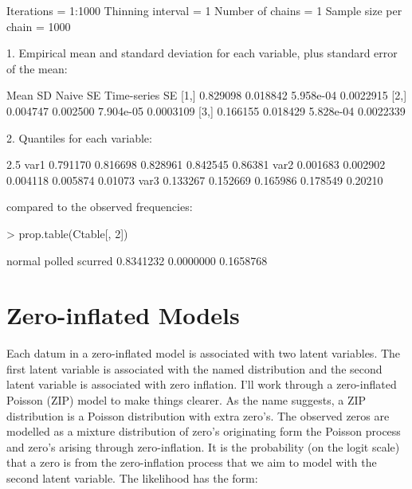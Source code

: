 \documentclass{article}
\begin{document}
\begin{Schunk}
\begin{Soutput}
Iterations = 1:1000
Thinning interval = 1 
Number of chains = 1 
Sample size per chain = 1000 

1. Empirical mean and standard deviation for each variable,
   plus standard error of the mean:

         Mean       SD  Naive SE Time-series SE
[1,] 0.829098 0.018842 5.958e-04      0.0022915
[2,] 0.004747 0.002500 7.904e-05      0.0003109
[3,] 0.166155 0.018429 5.828e-04      0.0022339

2. Quantiles for each variable:

         2.5%
var1 0.791170 0.816698 0.828961 0.842545 0.86381
var2 0.001683 0.002902 0.004118 0.005874 0.01073
var3 0.133267 0.152669 0.165986 0.178549 0.20210
\end{Soutput}
\end{Schunk}

compared to the observed frequencies:

\begin{Schunk}
\begin{Sinput}
> prop.table(Ctable[, 2])
\end{Sinput}
\begin{Soutput}
   normal    polled   scurred 
0.8341232 0.0000000 0.1658768 
\end{Soutput}
\end{Schunk}


\section{Zero-inflated Models}

Each datum in a zero-inflated model is associated with two latent variables. The first latent variable is associated with the named distribution and the second latent variable is associated with zero inflation. I'll work through a zero-inflated Poisson (ZIP) model to make things clearer. As the name suggests, a ZIP distribution is a Poisson distribution with extra zero's. The observed zeros are modelled as a mixture distribution of zero's originating form the Poisson process and zero's arising through zero-inflation. It is the probability (on the logit scale) that a zero is from the zero-inflation process that we aim to model with the second latent variable. The likelihood has the form:
\end{document}
